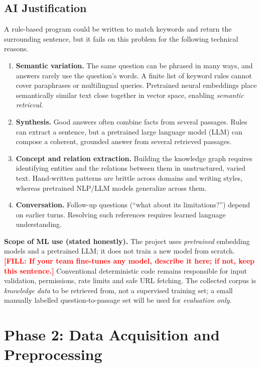 \documentclass[11pt,a4paper]{article}
\newcommand{\todo}[1]{\textcolor{red}{\textbf{[FILL: #1]}}}
\begin{document}
\subsection{AI Justification}
A rule-based program could be written to match keywords and return the surrounding sentence, but it fails on this problem for the following technical reasons.
\begin{enumerate}[nosep]
  \item \textbf{Semantic variation.} The same question can be phrased in many ways, and answers rarely use the question's words. A finite list of keyword rules cannot cover paraphrases or multilingual queries. Pretrained neural embeddings place semantically similar text close together in vector space, enabling \emph{semantic retrieval}.
  \item \textbf{Synthesis.} Good answers often combine facts from several passages. Rules can extract a sentence, but a pretrained large language model (LLM) can compose a coherent, grounded answer from several retrieved passages.
  \item \textbf{Concept and relation extraction.} Building the knowledge graph requires identifying entities and the relations between them in unstructured, varied text. Hand-written patterns are brittle across domains and writing styles, whereas pretrained NLP/LLM models generalize across them.
  \item \textbf{Conversation.} Follow-up questions (``what about its limitations?'') depend on earlier turns. Resolving such references requires learned language understanding.
\end{enumerate}
\textbf{Scope of ML use (stated honestly).} The project uses \emph{pretrained} embedding models and a pretrained LLM; it does not train a new model from scratch. \todo{If your team fine-tunes any model, describe it here; if not, keep this sentence.} Conventional deterministic code remains responsible for input validation, permissions, rate limits and safe URL fetching. The collected corpus is \emph{knowledge data} to be retrieved from, not a supervised training set; a small manually labelled question-to-passage set will be used for \emph{evaluation only}.

\section{Phase 2: Data Acquisition and Preprocessing}
\end{document}
